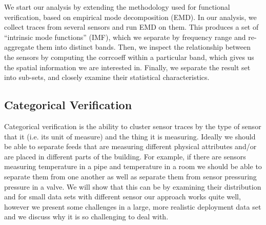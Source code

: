 


We start our analysis by extending the methodology used for functional verification, based on empirical mode decomposition (EMD).  
In our analysis, we collect traces from several sensors and run EMD on them.  This produces a set of 
``intrinsic mode functions'' (IMF), which we separate by frequency range and re-aggregate them into distinct bands.
Then, we inspect the relationship between the sensors by computing the corrcoeff within a particular band, which 
gives us the spatial information we are interested in. 
Finally, we separate the result set into sub-sets, and closely examine their statistical characteristics. 



\subsection{Categorical Verification}
Categorical verification is the ability to cluster sensor traces by the type of sensor that it (i.e. its unit of measure) and the thing it is measuring.
Ideally we should be able to separate feeds that are measuring different physical attributes and/or are placed in different parts of the building.
For example, if there are sensors measuring temperature in a pipe and temperature in a room we should be able to separate them from one another as well
as separate them from sensor pressuring pressure in a valve.  We will show that this can be by examining their distribution and for 
small data sets with different sensor our approach works quite well, however we present some challenges in a large, more realistic deployment
data set and we discuss why it is so challenging to deal with.



